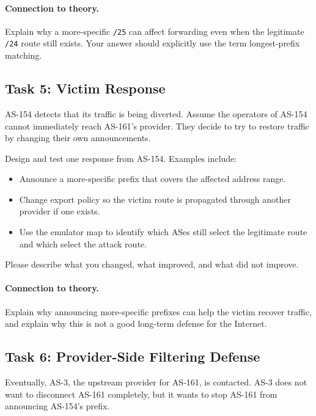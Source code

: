 \paragraph{Connection to theory.}
Explain why a more-specific \texttt{/25} can affect forwarding even when the
legitimate \texttt{/24} route still exists. Your answer should explicitly use
the term longest-prefix matching.


\subsection{Task 5: Victim Response}

AS-154 detects that its traffic is being diverted. Assume the operators of
AS-154 cannot immediately reach AS-161's provider. They decide to try to
restore traffic by changing their own announcements.

Design and test one response from AS-154. Examples include:

\begin{itemize}[noitemsep]
\item Announce a more-specific prefix that covers the affected address range.
\item Change export policy so the victim route is propagated through another
      provider if one exists.
\item Use the emulator map to identify which ASes still select the legitimate
      route and which select the attack route.
\end{itemize}

Please describe what you changed, what improved, and what did not improve.

\paragraph{Connection to theory.}
Explain why announcing more-specific prefixes can help the victim recover
traffic, and explain why this is not a good long-term defense for the Internet.


\subsection{Task 6: Provider-Side Filtering Defense}

Eventually, AS-3, the upstream provider for AS-161, is contacted. AS-3 does not
want to disconnect AS-161 completely, but it wants to stop AS-161 from
announcing AS-154's prefix.

